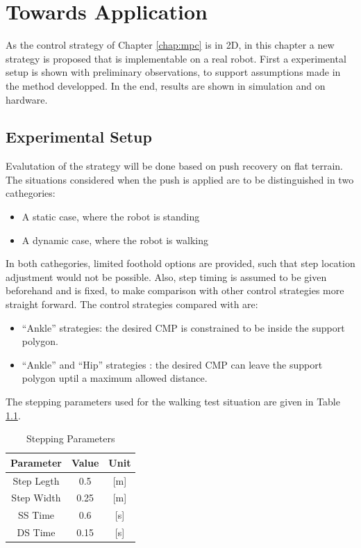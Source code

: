 %
\chapter{Towards Application}
As the control strategy of Chapter \ref{chap:mpc} is in \ac{2D}, in this chapter a new strategy is proposed that is implementable on a real robot. First a experimental setup is shown with preliminary observations, to support assumptions made in the method developped. In the end, results are shown in simulation and on hardware.
\section{Experimental Setup}
Evalutation of the strategy will be done based on push recovery on flat terrain. The situations considered when the push is applied are to be distinguished in two cathegories:
\begin{itemize}
	\item A static case, where the robot is standing
	\item A dynamic case, where the robot is walking
\end{itemize}
In both cathegories, limited foothold options are provided, such that step location adjustment would not be possible. Also, step timing is assumed to be given beforehand and is fixed, to make comparison with other control strategies more straight forward. The control strategies compared with are:
\begin{itemize}
	\item ``Ankle'' strategies: the desired \ac{CMP} is constrained to be inside the support polygon. 
	\item ``Ankle'' and ``Hip'' strategies : the desired \ac{CMP} can leave the support polygon uptil a maximum allowed distance.
\end{itemize}
The stepping parameters used for the walking test situation are given in Table \ref{tab:stepping}.
\begin{table}[ht]
\caption{Stepping Parameters} %
\centering %
\begin{tabular}{c c c } %
\hline\hline %
Parameter & Value & Unit \\
\hline %
Step Legth & 0.5 &  [m]\\
Step Width & 0.25 & [m]\\
\acs{SS} Time & 0.6 & [s]\\
\acs{DS} Time & 0.15 & [s]\\
\hline %
\end{tabular}
\label{tab:stepping} %
\end{table}
